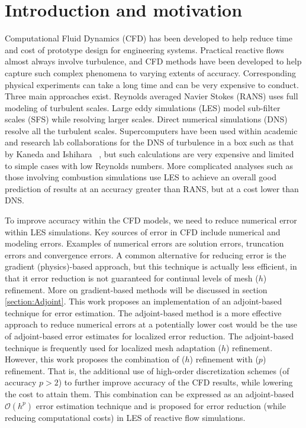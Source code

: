 \section{Introduction and motivation}

Computational Fluid Dynamics (CFD) has been developed to help reduce time and cost of prototype design for engineering systems. Practical reactive flows almost always involve turbulence, and CFD methods have been developed to help capture such complex phenomena to varying extents of accuracy. Corresponding physical experiments can take a long time and can be very expensive to conduct. Three main approaches exist. Reynolds averaged Navier Stokes (RANS) uses full modeling of turbulent scales. Large eddy simulations (LES) model sub-filter scales (SFS) while resolving larger scales. Direct numerical simulations (DNS) resolve all the turbulent scales. Supercomputers have been used within academic and research lab collaborations for the DNS of turbulence in a box such as that by Kaneda and Ishihara ~\cite{kaneda:2006}, but such calculations are very expensive and limited to simple cases with low Reynolds numbers. More complicated analyses such as those involving combustion simulations use LES to achieve an overall good prediction of results at an accuracy greater than RANS, but at a cost lower than DNS.\par 

To improve accuracy within the CFD models, we need to reduce numerical error within LES simulations. Key sources of error in CFD include numerical and modeling errors. Examples of numerical errors are solution errors, truncation errors and convergence errors. A common alternative for reducing error is the gradient (physics)-based approach, but this technique is actually less efficient, in that it error reduction is not guaranteed for continual levels of mesh ($h$) refinement. More on gradient-based methods will be discussed in section \ref{section:Adjoint}. This work proposes an implementation of an adjoint-based technique for error estimation. The adjoint-based method is a more effective approach to reduce numerical errors at a potentially lower cost would be the use of adjoint-based error estimates for localized error reduction. The adjoint-based technique is frequently used for localized mesh adaptation ($h$) refinement. However, this work proposes the combination of ($h$) refinement with ($p$) refinement. That is, the additional use of high-order discretization schemes (of accuracy $ p>2 $) to further improve accuracy of the CFD results, while lowering the cost to attain them.  This combination can be expressed as an adjoint-based $\mathcal{O}(h^p)$ error estimation technique and is proposed for error reduction (while reducing computational costs) in LES of reactive flow simulations.\par 